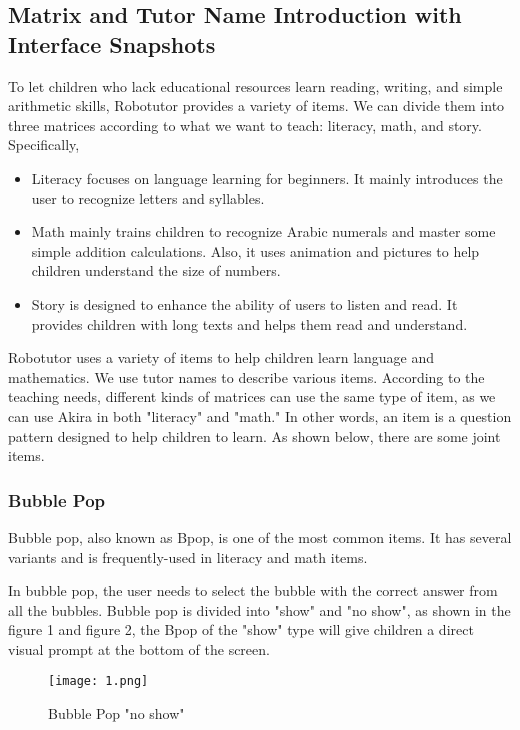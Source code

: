 \documentclass[hyperref]{ctexart}
\begin{document}
\begin{multicols}{2}
	\subsection{Matrix and Tutor Name Introduction with Interface Snapshots}
	To let children who lack educational resources learn reading, writing, and simple arithmetic skills, Robotutor provides a variety of items. We can divide them into three matrices according to what we want to teach: literacy, math, and story. Specifically,
\begin{itemize}
\item \textbf{}
    Literacy focuses on language learning for beginners. It mainly introduces the user to recognize letters and syllables.
\item \textbf{}
    Math mainly trains children to recognize Arabic numerals and master some simple addition calculations. Also, it uses animation and pictures to help children understand the size of numbers.
\item \textbf{}
    Story is designed to enhance the ability of users to listen and read. It provides children with long texts and helps them read and understand.
\end{itemize}
    
    
    Robotutor uses a variety of items to help children learn language and mathematics. We use tutor names to describe various items. According to the teaching needs, different kinds of matrices can use the same type of item, as we can use Akira in both "literacy" and "math." In other words, an item is a question pattern designed to help children to learn. As shown below, there are some joint items.

	\subsubsection{Bubble Pop}
    Bubble pop, also known as Bpop, is one of the most common items. It has several variants and is frequently-used in literacy and math items.


    In bubble pop, the user needs to select the bubble with the correct answer from all the bubbles. Bubble pop is divided into "show" and "no show", as shown in the figure 1 and figure 2, the Bpop of the "show" type will give children a direct visual prompt at the bottom of the screen.
    
    \begin{figure}[H]
    \small
    \centering
    \texttt{[image: 1.png]}
    \caption{Bubble Pop "no show"} \label{fig:aa}
    \end{figure}
    

\end{multicols}
\end{document}

